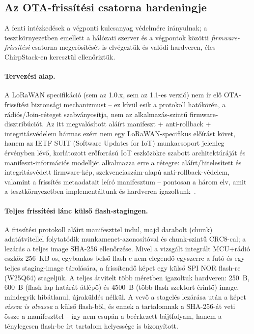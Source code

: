 \documentclass[12pt,a4paper]{article}
\begin{document}
\subsection{Az OTA-frissítési csatorna hardeningje}

A fenti intézkedések a végponti kulcsanyag védelmére irányulnak; a
tesztkörnyezetben emellett a hálózati szerver és a végpontok közötti
\emph{firmware-frissítési} csatorna megerősítését is elvégeztük és valódi
hardveren, éles ChirpStack-en keresztül ellenőriztük.

\paragraph{Tervezési alap.} A LoRaWAN specifikáció (sem az 1.0.x, sem az
1.1-es verzió) nem ír elő OTA-frissítési biztonsági mechanizmust -- ez
kívül esik a protokoll hatókörén, a rádiós/Join-réteget szabványosítja,
nem az alkalmazás-szintű firmware-disztribúciót. Az itt megvalósított
aláírt manifeszt + anti-rollback + integritásvédelem hármas ezért nem egy
LoRaWAN-specifikus előírást követ, hanem az IETF SUIT (Software Updates
for IoT) munkacsoport jelenleg érvényben lévő, korlátozott erőforrású IoT
eszközökre szabott architektúráját és manifeszt-információs modelljét
alkalmazza erre a rétegre: aláírt/hitelesített és integritásvédett
firmware-kép, szekvenciaszám-alapú anti-rollback-védelem, valamint a
frissítés metaadatait leíró manifesztum -- pontosan a három elv, amit a
tesztkörnyezetben implementáltunk és hardveren
igazoltunk~\cite{rfc9019, rfc9124}.

\paragraph{Teljes frissítési lánc külső flash-stagingen.} A frissítési
protokoll aláírt manifeszttel indul, majd darabolt (chunk) adatátvitellel
folytatódik munkamenet-azonosítóval és chunk-szintű CRC8-cal; a lezárás a
teljes image SHA-256 ellenőrzése. Mivel a vizsgált integrált MCU+rádió eszköz
256~KB-os, egybankos belső flash-e nem elegendő egyszerre a futó és egy teljes
staging-image tárolására, a frissítendő képet egy külső SPI NOR flash-re
(W25Q64) stageljük. A teljes átvitelt több méretben igazoltuk hardveren:
250~B, 600~B (flash-lap határát átlépő) és 4500~B (több flash-szektort érintő)
image, mindegyik hibátlanul, újraküldés nélkül. A vevő a stagelés lezárása után
a képet \emph{vissza is olvassa} a külső flash-ből, és ennek a tartalomnak a
SHA-256-át veti össze a manifeszttel -- így nem csupán a beérkezett bájtfolyam,
hanem a ténylegesen flash-be írt tartalom helyessége is bizonyított.
\end{document}
